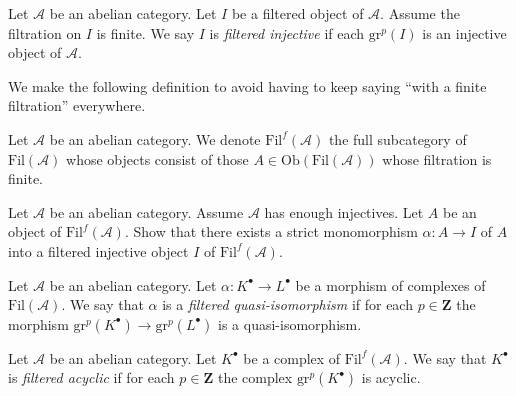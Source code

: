 \begin{definition}
\label{definition-injective-filtered}
Let $\mathcal{A}$ be an abelian category.
Let $I$ be a filtered object of $\mathcal{A}$.
Assume the filtration on $I$ is finite.
We say $I$ is {\it filtered injective} if each $\text{gr}^p(I)$ is
an injective object of $\mathcal{A}$.
\end{definition}

\noindent
We make the following definition to avoid having to keep saying
``with a finite filtration'' everywhere.

\begin{definition}
\label{definition-finite-filtration-category}
Let $\mathcal{A}$ be an abelian category.
We denote {\it $\text{Fil}^f(\mathcal{A})$} the full subcategory
of $\text{Fil}(\mathcal{A})$ whose objects consist of
those $A \in \text{Ob}(\text{Fil}(\mathcal{A}))$
whose filtration is finite.
\end{definition}

\begin{exercise}
\label{exercise-inject-into-injective}
Let $\mathcal{A}$ be an abelian category.
Assume $\mathcal{A}$ has enough injectives.
Let $A$ be an object of $\text{Fil}^f(\mathcal{A})$.
Show that there exists a strict monomorphism $\alpha : A \to I$
of $A$ into a filtered injective object $I$ of $\text{Fil}^f(\mathcal{A})$.
\end{exercise}

\begin{definition}
\label{definition-filtered-quasi-isomorphism}
Let $\mathcal{A}$ be an abelian category.
Let $\alpha : K^\bullet \to L^\bullet$ be a morphism of
complexes of $\text{Fil}(\mathcal{A})$. We say that
$\alpha$ is a {\it filtered quasi-isomorphism} if
for each $p \in \mathbf{Z}$ the morphism
$\text{gr}^p(K^\bullet) \to \text{gr}^p(L^\bullet)$ is
a quasi-isomorphism.
\end{definition}

\begin{definition}
\label{definition-filtered-acyclic}
Let $\mathcal{A}$ be an abelian category.
Let $K^\bullet$ be a complex of $\text{Fil}^f(\mathcal{A})$.
We say that $K^\bullet$ is {\it filtered acyclic} if
for each $p \in \mathbf{Z}$ the complex $\text{gr}^p(K^\bullet)$ is
acyclic.
\end{definition}

